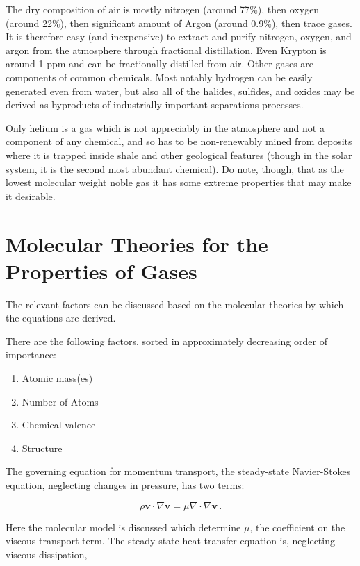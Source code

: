 \documentclass{article}
\begin{document}
The dry composition of air is mostly nitrogen (around 77\%), then
oxygen (around 22\%), then significant amount of Argon (around 0.9\%),
then trace gases. It is therefore easy (and inexpensive) to extract
and purify nitrogen, oxygen, and argon from the atmosphere through
fractional distillation. Even Krypton is around 1 ppm and can be
fractionally distilled from air. Other gases are components of common
chemicals. Most notably hydrogen can be easily generated even from
water, but also all of the halides, sulfides, and oxides may be derived
as byproducts of industrially important separations processes. 

Only helium is a gas which is not appreciably in the atmosphere and
not a component of any chemical, and so has to be non-renewably mined
from deposits where it is trapped inside shale and other geological
features (though in the solar system, it is the second most abundant
chemical). Do note, though, that as the lowest molecular weight noble
gas it has some extreme properties that may make it desirable.

\section{Molecular Theories for the Properties of Gases}

The relevant factors can be discussed based on the molecular theories by
which the equations are derived.

There are the following factors, sorted in approximately decreasing
order of importance:

\begin{enumerate}
\item Atomic mass(es)
\item Number of Atoms
\item Chemical valence
\item Structure
\end{enumerate}

The governing equation for momentum transport, the steady-state
Navier-Stokes equation, neglecting changes in pressure, has two terms:

\begin{equation}
\rho \mathbf{v} \cdot \nabla \mathbf{v} = \mu \nabla \cdot \nabla \mathbf{v} \,.
\end{equation}

Here the molecular model is discussed which determine $\mu$,
the coefficient on the viscous transport term. The steady-state heat
transfer equation is, neglecting viscous dissipation,
\end{document}
